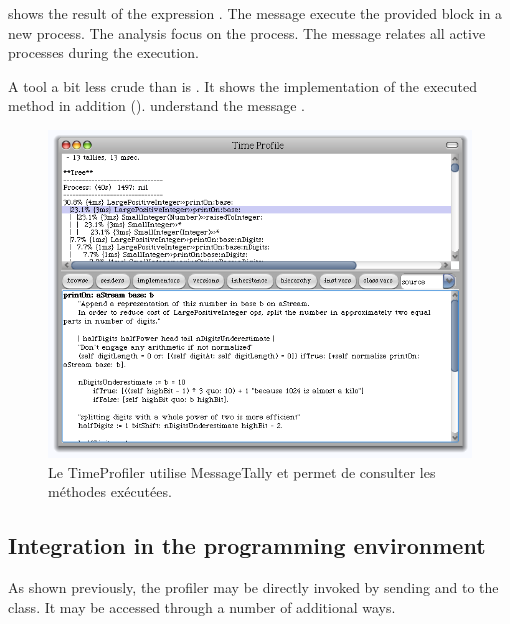 \documentclass[a4paper,10pt,twoside]{book}
\begin{document}
 shows the result of the expression .
The message  execute the provided block in a new process. The analysis focus on the process. The message  relates all active processes during the execution. 


A tool a bit less crude than  is . It shows the implementation of the executed method in addition ().   understand the message .


\begin{figure}
	\begin{center}
	\includegraphics[width=.8\linewidth]{TimeProfiler}
	\caption{Le TimeProfiler utilise MessageTally et permet de consulter les m\'ethodes ex\'ecut\'ees.
	}
	\end{center}
\end{figure}


\subsection{Integration in the programming environment}
As shown previously, the profiler may be directly invoked by sending  and  to the  class. It may be accessed through a number of additional ways.
\end{document}

